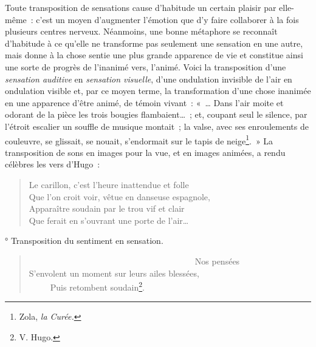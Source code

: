 \documentclass[french,twoside]{book} %
\begin{document}
Toute transposition de sensations cause d’habitude un certain plaisir par elle-même : c’est un moyen d’augmenter l’émotion que d’y faire collaborer à la fois plusieurs centres nerveux. Néanmoins, une bonne métaphore se reconnaît d’habitude à ce qu’elle ne transforme pas seulement une sensation en une autre, mais donne à la chose sentie une plus grande apparence de vie et constitue ainsi une sorte de progrès de l’inanimé vers, l’animé. Voici la transposition d’une \emph{sensation auditive} en \emph{sensation visuelle}, d’une ondulation invisible de l’air en ondulation visible et, par ce moyen terme, la transformation d’une chose inanimée en une apparence d’être animé, de témoin vivant : « … Dans l’air moite et odorant de la pièce les trois bougies flambaient… ; et, coupant seul le silence, par l’étroit escalier un souffle de musique montait ; la valse, avec ses enroulements de couleuvre, se glissait, se nouait, s’endormait sur le tapis de neige\footnote{ Zola, \emph{la Curée.}}. » La transposition de sons en images pour la vue, et en images animées, a rendu célèbres les vers d’Hugo :\par


\begin{verse}
Le carillon, c’est l’heure inattendue et folle\\
Que l’on croit voir, vêtue en danseuse espagnole,\\
Apparaître soudain par le trou vif et clair\\
Que ferait en s’ouvrant une porte de l’air…\\
\end{verse}

° Transposition du sentiment en sensation.\par


\begin{verse}
                                       Nos pensées\\
S’envolent un moment sur leurs ailes blessées,\\
     Puis retombent soudain\footnote{V. Hugo.}.\\
\end{verse}
\end{document}

